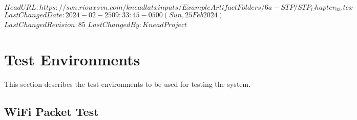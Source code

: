 \svnidlong
{$HeadURL: https://svn.riouxsvn.com/kneadlatxinputs/ExampleArtifactFolders/6a-STP/STP_Chapter_03.tex $}
{$LastChangedDate: 2024-02-25 09:33:45 -0500 (Sun, 25 Feb 2024) $}
{$LastChangedRevision: 85 $}
{$LastChangedBy: KneadProject $}


\chapter{Test Environments}
\label{loc:TestEnvironments}
% 

This section describes the test environments to be used for testing the system.

\section{WiFi Packet Test}
\label{loc:TestEnvironmentOne}
\newcommand{\TestEnvName}{WiFi Packet Test}%


% 



